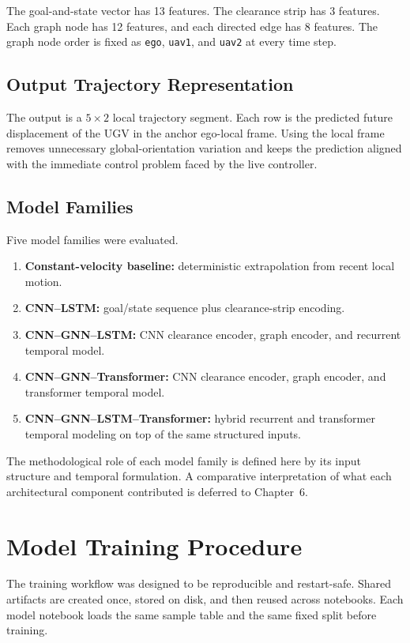 The goal-and-state vector has 13 features. The clearance strip has 3 features. Each graph node has 12 features, and each directed edge has 8 features. The graph node order is fixed as \texttt{ego}, \texttt{uav1}, and \texttt{uav2} at every time step.

\subsection{Output Trajectory Representation}

The output is a $5 \times 2$ local trajectory segment. Each row is the predicted future displacement of the UGV in the anchor ego-local frame. Using the local frame removes unnecessary global-orientation variation and keeps the prediction aligned with the immediate control problem faced by the live controller.

\subsection{Model Families}

Five model families were evaluated.

\begin{enumerate}
\item \textbf{Constant-velocity baseline:} deterministic extrapolation from recent local motion.
\item \textbf{CNN--LSTM:} goal/state sequence plus clearance-strip encoding.
\item \textbf{CNN--GNN--LSTM:} CNN clearance encoder, graph encoder, and recurrent temporal model.
\item \textbf{CNN--GNN--Transformer:} CNN clearance encoder, graph encoder, and transformer temporal model.
\item \textbf{CNN--GNN--LSTM--Transformer:} hybrid recurrent and transformer temporal modeling on top of the same structured inputs.
\end{enumerate}

The methodological role of each model family is defined here by its input structure and temporal formulation. A comparative interpretation of what each architectural component contributed is deferred to Chapter~6.

\section{Model Training Procedure}

The training workflow was designed to be reproducible and restart-safe. Shared artifacts are created once, stored on disk, and then reused across notebooks. Each model notebook loads the same sample table and the same fixed split before training.

